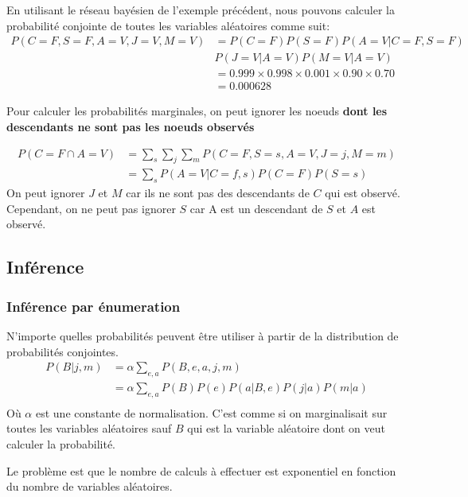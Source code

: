 \begin{example}\leavevmode
    En utilisant le réseau bayésien de l'exemple précédent, nous pouvons calculer la probabilité conjointe de toutes les variables aléatoires comme suit: 
    \begin{align*}
        P(C=F, S=F, A=V, J=V, M=V) 
        &= P(C=F)P(S=F)P(A=V|C=F, S=F)\\ & P(J=V|A=V)P(M=V|A=V) \\
        &= 0.999 \times 0.998 \times 0.001 \times 0.90 \times 0.70 \\
        &= 0.000628
    \end{align*}
\end{example}

Pour calculer les probabilités marginales, on peut ignorer les noeuds 
\textbf{dont les descendants ne sont pas les noeuds observés}

\begin{example}\leavevmode
    \begin{align*}
        P(C=F \cap A=V) &= \sum_{s} \sum_{j} \sum_{m} P(C=F, S=s, A=V, J=j, M=m) \\
                        &= \sum_{s} P(A=V | C=f, s) P(C=F) P(S=s) 
    \end{align*}
    On peut ignorer $J$ et $M$ car ils ne sont pas des descendants de $C$ qui est observé.
    Cependant, on ne peut pas ignorer $S$ car A est un descendant de $S$ et $A$ est observé.
\end{example}

\subsection{Inférence} %
\label{sub:inference}

\subsubsection{Inférence par énumeration} %
\label{sec:enumeration}


\begin{remark}\leavevmode
    N'importe quelles probabilités peuvent être utiliser à partir de la distribution de probabilités conjointes.
    \begin{align*}
        P(B | j, m) &= \alpha \sum_{e,a} P(B, e, a, j, m) \\ 
                    &= \alpha \sum_{e,a} P(B) P(e) P(a|B,e) P(j|a) P(m|a) \\
    \end{align*}
    Où $\alpha$ est une constante de normalisation. C'est comme si on marginalisait sur toutes les variables aléatoires sauf $B$ qui est la variable aléatoire dont on veut calculer la probabilité.

    Le problème est que le nombre de calculs à effectuer est exponentiel en fonction du nombre de variables aléatoires.
\end{remark}

